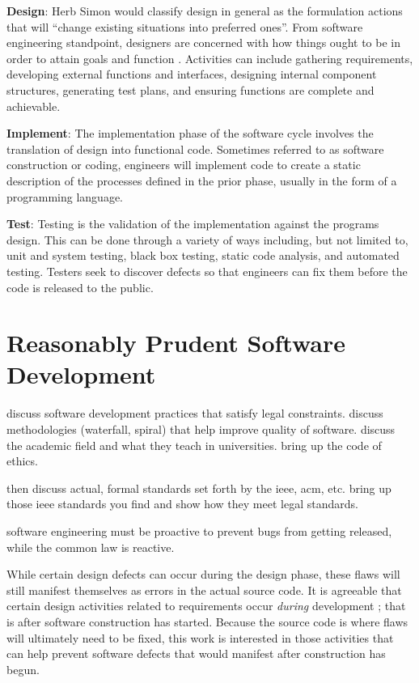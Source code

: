 \documentclass[12pt]{report}
\begin{document}
\textbf{Design}: Herb Simon would classify design in general as the formulation actions that will ``change existing situations into preferred ones''. From software engineering standpoint, designers are concerned with how things ought to be in order to attain goals and function \cite{simon}. Activities can include gathering requirements, developing external functions and interfaces, designing internal component structures, generating test plans, and ensuring functions are complete and achievable. 

\textbf{Implement}: The implementation phase of the software cycle involves the translation of design into functional code. Sometimes referred to as software construction or coding, engineers will implement code to create a static description of the processes defined in the prior phase, usually in the form of a programming language. 

\textbf{Test}: Testing is the validation of the implementation against the programs design. This can be done through a variety of ways including, but not limited to, unit and system testing, black box testing, static code analysis, and automated testing. Testers seek to discover defects so that engineers can fix them before the code is released to the public. 

\section{Reasonably Prudent Software Development} 
discuss software development practices that satisfy legal constraints. discuss methodologies (waterfall, spiral) that help improve quality of software. discuss the academic field and what they teach in universities. bring up the code of ethics.  

then discuss actual, formal standards set forth by the ieee, acm, etc. bring up those ieee standards you find and show how they meet legal standards.  

software engineering must be proactive to prevent bugs from getting released, while the common law is reactive. 

While certain design defects can occur during the design phase, these flaws will still manifest themselves as errors in the actual source code. It is agreeable that certain design activities related to requirements occur \textit{during} development \cite{Turner99}; that is after software construction has started. Because the source code is where flaws will ultimately need to be fixed, this work is interested in those activities that can help prevent software defects that would manifest after construction has begun.
\end{document}
